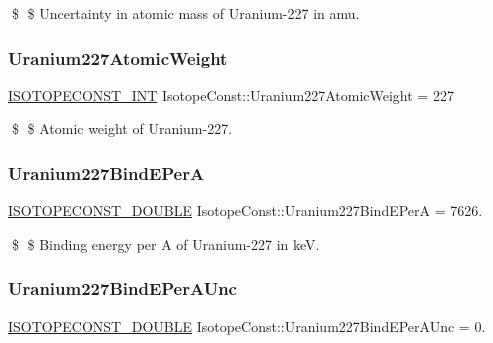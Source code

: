 \$ \$ Uncertainty in atomic mass of Uranium-\/227 in amu. \mbox{\label{group___isotope_const-_uranium-_u227_ga7ab5c2d33e270f1719fa94b88450a890}} 
\subsubsection{\texorpdfstring{Uranium227\+Atomic\+Weight}{Uranium227AtomicWeight}}
{\footnotesize\ttfamily \mbox{\hyperlink{group___isotope_const-_macros_ga5f18360b3e99483a35c32d789e62621c}{I\+S\+O\+T\+O\+P\+E\+C\+O\+N\+S\+T\+\_\+\+I\+NT}} Isotope\+Const\+::\+Uranium227\+Atomic\+Weight = 227}

\$ \$ Atomic weight of Uranium-\/227. \mbox{\label{group___isotope_const-_uranium-_u227_ga0955a3640b01a54a0a77c6b6a7e835a0}} 
\subsubsection{\texorpdfstring{Uranium227\+Bind\+E\+PerA}{Uranium227BindEPerA}}
{\footnotesize\ttfamily \mbox{\hyperlink{group___isotope_const-_macros_ga8f45a7272ce02c0b4c65c44636ed719a}{I\+S\+O\+T\+O\+P\+E\+C\+O\+N\+S\+T\+\_\+\+D\+O\+U\+B\+LE}} Isotope\+Const\+::\+Uranium227\+Bind\+E\+PerA = 7626.}

\$ \$ Binding energy per A of Uranium-\/227 in keV. \mbox{\label{group___isotope_const-_uranium-_u227_gaf7c615f6c0b63598d4917625d823dadc}} 
\subsubsection{\texorpdfstring{Uranium227\+Bind\+E\+Per\+A\+Unc}{Uranium227BindEPerAUnc}}
{\footnotesize\ttfamily \mbox{\hyperlink{group___isotope_const-_macros_ga8f45a7272ce02c0b4c65c44636ed719a}{I\+S\+O\+T\+O\+P\+E\+C\+O\+N\+S\+T\+\_\+\+D\+O\+U\+B\+LE}} Isotope\+Const\+::\+Uranium227\+Bind\+E\+Per\+A\+Unc = 0.}

